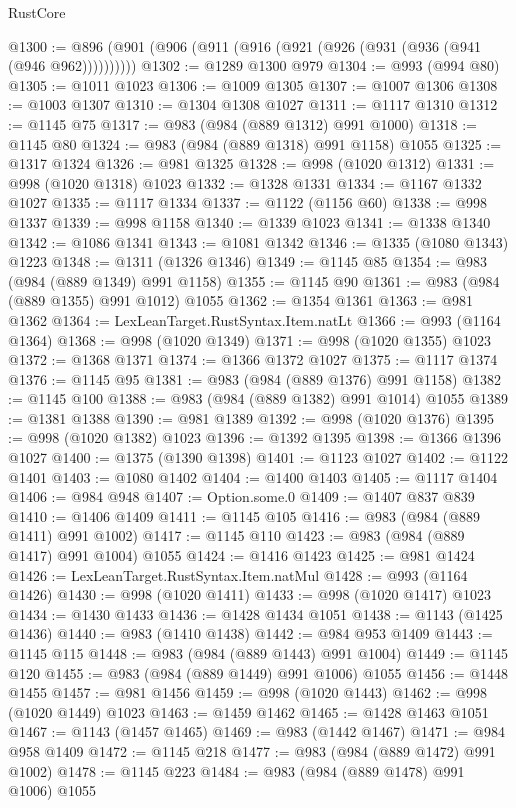 \begin{lexlean}{RustCore}
\begin{coremodule}
@1300 := @896 (@901 (@906 (@911 (@916 (@921 (@926 (@931 (@936 (@941 (@946 @962))))))))))
@1302 := @1289 @1300 @979
@1304 := @993 (@994 @80)
@1305 := @1011 @1023
@1306 := @1009 @1305
@1307 := @1007 @1306
@1308 := @1003 @1307
@1310 := @1304 @1308 @1027
@1311 := @1117 @1310
@1312 := @1145 @75
@1317 := @983 (@984 (@889 @1312) @991 @1000)
@1318 := @1145 @80
@1324 := @983 (@984 (@889 @1318) @991 @1158) @1055
@1325 := @1317 @1324
@1326 := @981 @1325
@1328 := @998 (@1020 @1312)
@1331 := @998 (@1020 @1318) @1023
@1332 := @1328 @1331
@1334 := @1167 @1332 @1027
@1335 := @1117 @1334
@1337 := @1122 (@1156 @60)
@1338 := @998 @1337
@1339 := @998 @1158
@1340 := @1339 @1023
@1341 := @1338 @1340
@1342 := @1086 @1341
@1343 := @1081 @1342
@1346 := @1335 (@1080 @1343) @1223
@1348 := @1311 (@1326 @1346)
@1349 := @1145 @85
@1354 := @983 (@984 (@889 @1349) @991 @1158)
@1355 := @1145 @90
@1361 := @983 (@984 (@889 @1355) @991 @1012) @1055
@1362 := @1354 @1361
@1363 := @981 @1362
@1364 := LexLeanTarget.RustSyntax.Item.natLt
@1366 := @993 (@1164 @1364)
@1368 := @998 (@1020 @1349)
@1371 := @998 (@1020 @1355) @1023
@1372 := @1368 @1371
@1374 := @1366 @1372 @1027
@1375 := @1117 @1374
@1376 := @1145 @95
@1381 := @983 (@984 (@889 @1376) @991 @1158)
@1382 := @1145 @100
@1388 := @983 (@984 (@889 @1382) @991 @1014) @1055
@1389 := @1381 @1388
@1390 := @981 @1389
@1392 := @998 (@1020 @1376)
@1395 := @998 (@1020 @1382) @1023
@1396 := @1392 @1395
@1398 := @1366 @1396 @1027
@1400 := @1375 (@1390 @1398)
@1401 := @1123 @1027
@1402 := @1122 @1401
@1403 := @1080 @1402
@1404 := @1400 @1403
@1405 := @1117 @1404
@1406 := @984 @948
@1407 := Option.some.{0}
@1409 := @1407 @837 @839
@1410 := @1406 @1409
@1411 := @1145 @105
@1416 := @983 (@984 (@889 @1411) @991 @1002)
@1417 := @1145 @110
@1423 := @983 (@984 (@889 @1417) @991 @1004) @1055
@1424 := @1416 @1423
@1425 := @981 @1424
@1426 := LexLeanTarget.RustSyntax.Item.natMul
@1428 := @993 (@1164 @1426)
@1430 := @998 (@1020 @1411)
@1433 := @998 (@1020 @1417) @1023
@1434 := @1430 @1433
@1436 := @1428 @1434 @1051
@1438 := @1143 (@1425 @1436)
@1440 := @983 (@1410 @1438)
@1442 := @984 @953 @1409
@1443 := @1145 @115
@1448 := @983 (@984 (@889 @1443) @991 @1004)
@1449 := @1145 @120
@1455 := @983 (@984 (@889 @1449) @991 @1006) @1055
@1456 := @1448 @1455
@1457 := @981 @1456
@1459 := @998 (@1020 @1443)
@1462 := @998 (@1020 @1449) @1023
@1463 := @1459 @1462
@1465 := @1428 @1463 @1051
@1467 := @1143 (@1457 @1465)
@1469 := @983 (@1442 @1467)
@1471 := @984 @958 @1409
@1472 := @1145 @218
@1477 := @983 (@984 (@889 @1472) @991 @1002)
@1478 := @1145 @223
@1484 := @983 (@984 (@889 @1478) @991 @1006) @1055

\end{coremodule}
\end{lexlean}
